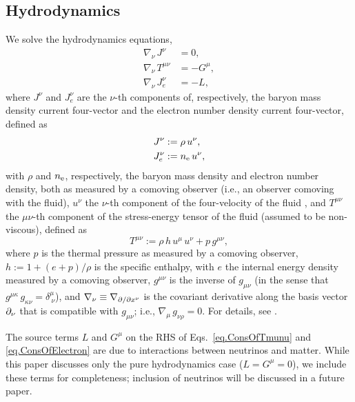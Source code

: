 \subsection{Hydrodynamics}
\label{ss.hydrodynamics}

We solve the hydrodynamics equations,
\begin{align}
  \nabla_{\nu}\,J^{\nu}&=0,\label{eq.ConsOfMass}\\
  \nabla_{\nu}\,T^{\mu\nu}&=-G^{\mu}\label{eq.ConsOfTmunu},\\
  \nabla_{\nu}\,J_{e}^{\nu}&=-L\label{eq.ConsOfElectron},
\end{align}
where $J^{\nu}$ and $J_{e}^{\nu}$ are the $\nu$-th components of, respectively,
the baryon mass density current four-vector and
the electron number density current four-vector,
defined as
\begin{align}
  J^{\nu}&:=\rho\,u^{\nu},\\
  J_{e}^{\nu}&:=n_{\mathrm{e}}\,u^{\nu},
\end{align}
with $\rho$ and $n_{\mathrm{e}}$, respectively, the baryon mass density
and electron number density, both as measured by a comoving observer
(i.e., an observer comoving with the fluid),
$u^{\nu}$ the $\nu$-th component of the four-velocity of the fluid
%
,
and $T^{\mu\nu}$ the $\mu\nu$-th component of the
stress-energy tensor of the fluid (assumed to be non-viscous),
defined as
\begin{equation}
  T^{\mu\nu}:=\rho\,h\,u^{\mu}\,u^{\nu}+p\,g^{\mu\nu},
  \label{eq.Tmunu}
\end{equation}
where $p$ is the thermal pressure as measured by a comoving observer,
$h:=1+\left(e+p\right)/\rho$ is the specific enthalpy, with $e$ the internal
energy density measured by a comoving observer, $g^{\mu\nu}$ is the
inverse of $g_{\mu\nu}$ (in the sense that
$g^{\mu\kappa}\,g_{\kappa\nu}=\delta^{\mu}_{~\nu}$),
and $\nabla_{\nu}\equiv\nabla_{\partial/\partial x^{\nu}}$ is the covariant derivative along the basis vector
$\partial_{\nu}$ that is compatible
with $g_{\mu\nu}$; i.e., $\nabla_{\mu}\,g_{\nu\rho}=0$.
For details, see \citet{rz2013}.

The source terms $L$ and $G^{\mu}$ on the RHS of Eqs.~\eqref{eq.ConsOfTmunu}
and \eqref{eq.ConsOfElectron} are due to interactions between
neutrinos and matter.
While this paper discusses only the pure hydrodynamics case ($L=G^{\mu}=0$),
we include these terms for completeness;
inclusion of neutrinos will be discussed in a future paper.

